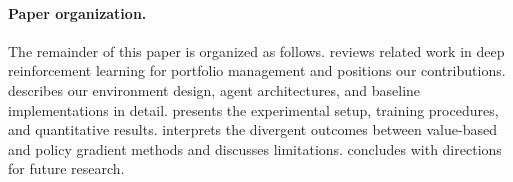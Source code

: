 \paragraph{Paper organization.} The remainder of this paper is organized as follows.  reviews related work in deep reinforcement learning for portfolio management and positions our contributions.  describes our environment design, agent architectures, and baseline implementations in detail.  presents the experimental setup, training procedures, and quantitative results.  interprets the divergent outcomes between value-based and policy gradient methods and discusses limitations.  concludes with directions for future research.
